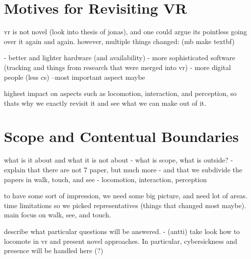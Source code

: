 


\section{Motives for Revisiting VR}

vr is not novel (look into thesis of jonas), and one could argue its pointless going over it again and again. however, multiple things changed: (mb make textbf)

- better and lighter hardware (and availability)
- more sophisticated software (tracking and things from research that were merged into vr)
- more digital people (less cs) --most important aspect maybe

highest impact on aspects such as locomotion, interaction, and perception, so thats why we exactly revisit it and see what we can make out of it.







\section{Scope and Contentual Boundaries}
what is it about and what it is not about
- what is scope, what is outside?
- explain that there are not 7 paper, but much more
- and that we subdivide the papers in walk, touch, and see - locomotion, interaction, perception






to have some sort of impression, we need some big picture, and need lot of areas. time limitations so we picked representatives (things that changed most maybe). main focus on walk, see, and touch.

describe what particular questions will be answered.
- (antti) take look how to locomote in vr and present novel approaches. In particular, cybersickness and presence will be handled here (?)


